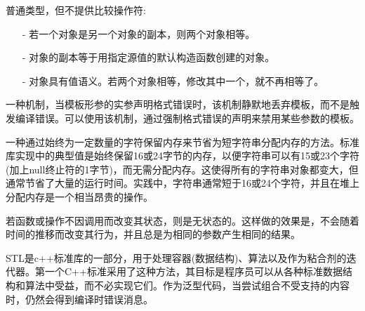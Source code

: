 



普通类型，但不提供比较操作符:

\begin{itemize}
\item [-]
若一个对象是另一个对象的副本，则两个对象相等。

\item [-]
对象的副本等于用指定源值的默认构造函数创建的对象。

\item [-]
对象具有值语义。若两个对象相等，修改其中一个，就不再相等了。
\end{itemize}


一种机制，当模板形参的实参声明格式错误时，该机制静默地丢弃模板，而不是触发编译错误。可以使用该机制，通过强制格式错误的声明来禁用某些参数的模板。


一种通过始终为一定数量的字符保留内存来节省为短字符串分配内存的方法。标准库实现中的典型值是始终保留16或24字节的内存，以便字符串可以有15或23个字符(加上null终止符的1字节)，而无需分配内存。这使得所有的字符串对象都变大，但通常节省了大量的运行时间。实践中，字符串通常短于16或24个字符，并且在堆上分配内存是一个相当昂贵的操作。


若函数或操作不因调用而改变其状态，则是无状态的。这样做的效果是，不会随着时间的推移而改变其行为，并且总是为相同的参数产生相同的结果。


STL是c++标准库的一部分，用于处理容器(数据结构)、算法以及作为粘合剂的迭代器。第一个C++标准采用了这种方法，其目标是程序员可以从各种标准数据结构和算法中受益，而不必实现它们。作为泛型代码，当尝试组合不受支持的内容时，仍然会得到编译时错误消息。



